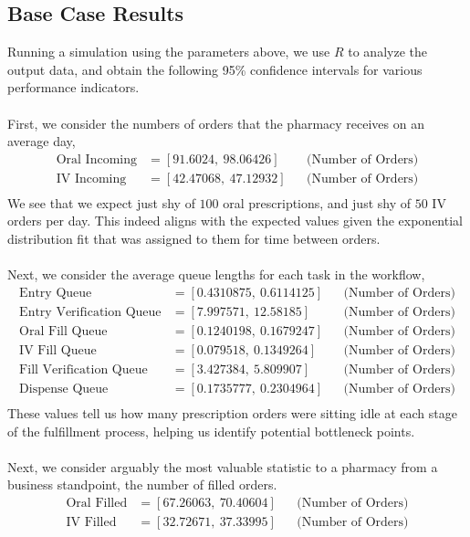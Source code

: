 \documentclass[10pt]{report}            %
\begin{document}
\subsection*{Base Case Results}
Running a simulation using the parameters above, we use $R$ to analyze the output data, and obtain the following 95\% confidence intervals for various performance indicators.\\\hfill\\
First, we consider the numbers of orders that the pharmacy receives on an average day,
\begin{align*}
\text{Oral Incoming} &= [91.6024,\ 98.06426] && \text{(Number of Orders)}\\
\text{IV Incoming} &= [42.47068,\ 47.12932] && \text{(Number of Orders)}\\
\end{align*}
We see that we expect just shy of $100$ oral prescriptions, and just shy of $50$ IV orders per day. This indeed aligns with the expected values given the exponential distribution fit that was assigned to them for time between orders.\\\hfill\\
Next, we consider the average queue lengths for each task in the workflow,
\begin{align*}
\text{Entry Queue} &= [0.4310875,\ 0.6114125] && \text{(Number of Orders)}\\
\text{Entry Verification Queue} &= [7.997571,\ 12.58185] && \text{(Number of Orders)}\\
\text{Oral Fill Queue} &= [0.1240198,\ 0.1679247] && \text{(Number of Orders)}\\
\text{IV Fill Queue} &= [0.079518,\ 0.1349264] && \text{(Number of Orders)}\\
\text{Fill Verification Queue} &= [3.427384,\ 5.809907] && \text{(Number of Orders)}\\
\text{Dispense Queue} &= [0.1735777,\ 0.2304964] && \text{(Number of Orders)}\\
\end{align*}
These values tell us how many prescription orders were sitting idle at each stage of the fulfillment process, helping us identify potential bottleneck points.\\\hfill\\
Next, we consider arguably the most valuable statistic to a pharmacy from a business standpoint, the number of filled orders. 
\begin{align*}
\text{Oral Filled} &= [67.26063,\ 70.40604] && \text{(Number of Orders)}\\
\text{IV Filled} &= [32.72671,\ 37.33995] && \text{(Number of Orders)}\\
\end{align*}
\end{document}
